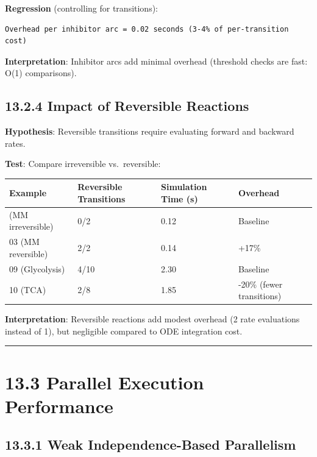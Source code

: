 \textbf{Regression} (controlling for transitions):

\begin{lstlisting}
Overhead per inhibitor arc = 0.02 seconds (3-4% of per-transition cost)
\end{lstlisting}

\textbf{Interpretation}: Inhibitor arcs add minimal overhead (threshold
checks are fast: O(1) comparisons).

\hypertarget{impact-of-reversible-reactions}{%
\subsection{13.2.4 Impact of Reversible
Reactions}\label{impact-of-reversible-reactions}}

\textbf{Hypothesis}: Reversible transitions require evaluating forward
and backward rates.

\textbf{Test}: Compare irreversible vs.~reversible:

\begin{longtable}[]{@{}llll@{}}
\toprule\noalign{}
Example & Reversible Transitions & Simulation Time (s) & Overhead \\
\midrule\noalign{}
\endhead
\bottomrule\noalign{}
\endlastfoot
02 (MM irreversible) & 0/2 & 0.12 & Baseline \\
03 (MM reversible) & 2/2 & 0.14 & +17\% \\
09 (Glycolysis) & 4/10 & 2.30 & Baseline \\
10 (TCA) & 2/8 & 1.85 & -20\% (fewer transitions) \\
\end{longtable}

\textbf{Interpretation}: Reversible reactions add modest overhead (2
rate evaluations instead of 1), but negligible compared to ODE
integration cost.

\begin{center}\rule{0.5\linewidth}{0.5pt}\end{center}

\hypertarget{parallel-execution-performance}{%
\section{13.3 Parallel Execution
Performance}\label{parallel-execution-performance}}

\hypertarget{weak-independence-based-parallelism}{%
\subsection{13.3.1 Weak Independence-Based
Parallelism}\label{weak-independence-based-parallelism}}

